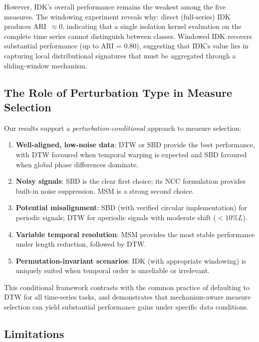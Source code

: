 However, IDK's overall performance remains the weakest among the five measures.
The windowing experiment reveals why: direct (full-series) IDK produces ARI~$\approx 0$, indicating that a single isolation kernel evaluation on the complete time series cannot distinguish between classes.
Windowed IDK recovers substantial performance (up to ARI = 0.80), suggesting that IDK's value lies in capturing local distributional signatures that must be aggregated through a sliding-window mechanism.

\subsection{The Role of Perturbation Type in Measure Selection}\label{sec:discuss-selection}

Our results support a \emph{perturbation-conditional} approach to measure selection:

\begin{enumerate}
    \item \textbf{Well-aligned, low-noise data}: DTW or SBD provide the best performance, with DTW favoured when temporal warping is expected and SBD favoured when global phase differences dominate.
    \item \textbf{Noisy signals}: SBD is the clear first choice; its NCC formulation provides built-in noise suppression. MSM is a strong second choice.
    \item \textbf{Potential misalignment}: SBD (with verified circular implementation) for periodic signals; DTW for aperiodic signals with moderate shift ($<10\%L$).
    \item \textbf{Variable temporal resolution}: MSM provides the most stable performance under length reduction, followed by DTW.
    \item \textbf{Permutation-invariant scenarios}: IDK (with appropriate windowing) is uniquely suited when temporal order is unreliable or irrelevant.
\end{enumerate}

This conditional framework contrasts with the common practice of defaulting to DTW for all time-series tasks, and demonstrates that mechanism-aware measure selection can yield substantial performance gains under specific data conditions.

\subsection{Limitations}\label{sec:discuss-limitations}

